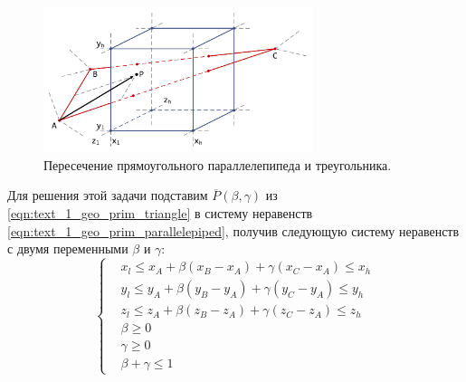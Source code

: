 \begin{figure}[ht]
\centering
\includegraphics[width=0.7\textwidth]{./pics/text_1_geo_prim/tri_block_intersect.pdf}
\singlespacing
{}\caption{Пересечение прямоугольного параллелепипеда и треугольника.}
\label{fig:text_1_geo_prim_tri_block_intersect}
\end{figure}

Для решения этой задачи подставим $\overline{P}(\beta, \gamma)$ из \eqref{eqn:text_1_geo_prim_triangle} в систему неравенств \eqref{eqn:text_1_geo_prim_parallelepiped}, получив следующую систему неравенств с двумя переменными $\beta$ и $\gamma$:
\begin{equation}\label{eqn:text_1_geo_prim_1}
	\left\{
		\begin{aligned}
			& x_l \le x_A + \beta (x_B - x_A) + \gamma (x_C - x_A) \le x_h \\
			& y_l \le y_A + \beta (y_B - y_A) + \gamma (y_C - y_A) \le y_h \\
			& z_l \le z_A + \beta (z_B - z_A) + \gamma (z_C - z_A) \le z_h \\
			& \beta \ge 0 \\
			& \gamma \ge 0 \\
			& \beta + \gamma \le 1
		\end{aligned}
	\right.
\end{equation}

